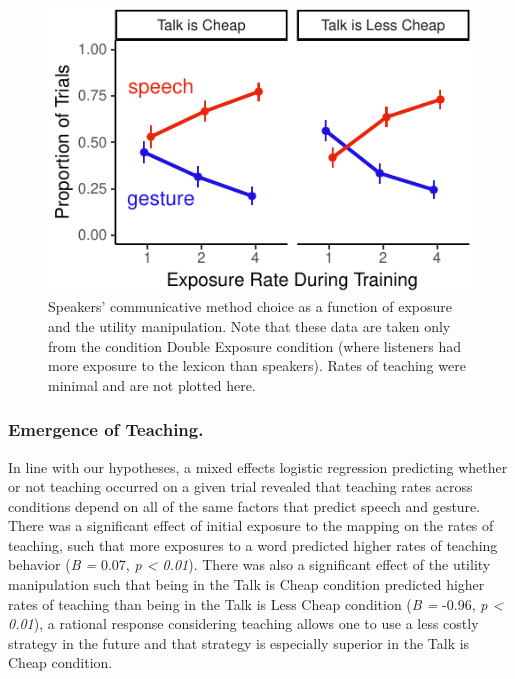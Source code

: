 \documentclass[10pt, letterpaper]{article}
\newenvironment{CodeChunk}{}{}
\begin{document}
\begin{CodeChunk}
\begin{figure}[tb]

{\centering \includegraphics{figs/exp_speech_gesture-1} 

}

\caption[Speakers' communicative method choice as a function of exposure and the utility manipulation]{Speakers' communicative method choice as a function of exposure and the utility manipulation. Note that these data are taken only from the condition Double Exposure condition (where listeners had more exposure to the lexicon than speakers). Rates of teaching were minimal and are not plotted here.}\label{fig:exp_speech_gesture}
\end{figure}
\end{CodeChunk}

\subsubsection{Emergence of Teaching.}\label{emergence-of-teaching.}

In line with our hypotheses, a mixed effects logistic regression
predicting whether or not teaching occurred on a given trial revealed
that teaching rates across conditions depend on all of the same factors
that predict speech and gesture. There was a significant effect of
initial exposure to the mapping on the rates of teaching, such that more
exposures to a word predicted higher rates of teaching behavior (\emph{B
=} 0.07, \emph{p \textless{} 0.01}). There was also a significant effect
of the utility manipulation such that being in the Talk is Cheap
condition predicted higher rates of teaching than being in the Talk is
Less Cheap condition (\emph{B =} -0.96, \emph{p \textless{} 0.01}), a
rational response considering teaching allows one to use a less costly
strategy in the future and that strategy is especially superior in the
Talk is Cheap condition.
\end{document}
